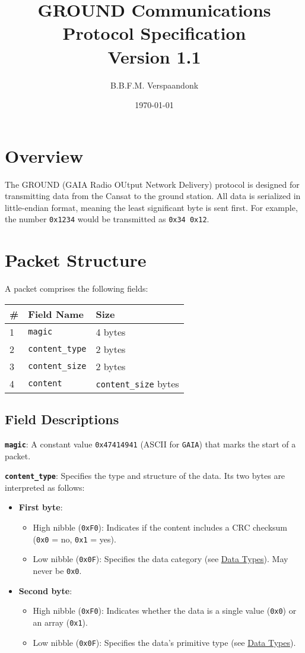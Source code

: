 \documentclass[a4paper]{article}
\title{GROUND Communications Protocol Specification\\ \large Version 1.1}
\date{\today}
\author{B.B.F.M. Verspaandonk}
\begin{document}
\maketitle

\section*{Overview}
The GROUND (GAIA Radio OUtput Network Delivery) protocol is designed for transmitting data from the Cansat to the ground station. All data is serialized in little-endian format, meaning the least significant byte is sent first. For example, the number \texttt{0x1234} would be transmitted as \texttt{0x34 0x12}.

\section*{Packet Structure}
A packet comprises the following fields:
\begin{longtable}{@{}lll@{}}
\toprule
\# & Field Name         & Size                \\
\midrule
1  & \texttt{magic}      & 4 bytes             \\
2  & \texttt{content\_type} & 2 bytes             \\
3  & \texttt{content\_size} & 2 bytes             \\
4  & \texttt{content}     & \texttt{content\_size} bytes \\
\bottomrule
\end{longtable}

\subsection*{Field Descriptions}
\textbf{\texttt{magic}}: A constant value \texttt{0x47414941} (ASCII for \texttt{GAIA}) that marks the start of a packet.

\textbf{\texttt{content\_type}}: Specifies the type and structure of the data. Its two bytes are interpreted as follows:
\begin{itemize}
  \item \textbf{First byte}:
  \begin{itemize}
    \item High nibble (\texttt{0xF0}): Indicates if the content includes a CRC checksum (\texttt{0x0} = no, \texttt{0x1} = yes).
    \item Low nibble (\texttt{0x0F}): Specifies the data category  (see \hyperref[data-types]{Data Types}). May never be \texttt{0x0}.
  \end{itemize}
  \item \textbf{Second byte}:
  \begin{itemize}
    \item High nibble (\texttt{0xF0}): Indicates whether the data is a single value (\texttt{0x0}) or an array (\texttt{0x1}).
    \item Low nibble (\texttt{0x0F}): Specifies the data's primitive type (see \hyperref[data-types]{Data Types}).
  \end{itemize}
\end{itemize}
\end{document}
